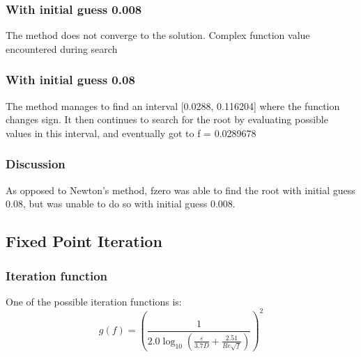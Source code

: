 \documentclass{article}
\begin{document}
    \subsubsection{With initial guess 0.008}
    The method does not converge to the solution. Complex function value encountered during search
    \subsubsection{With initial guess 0.08}
    The method manages to find an interval [0.0288, 0.116204] where the function changes sign. It then continues to search for the root by evaluating possible values in this interval, and eventually got to f = 0.0289678 
    \subsubsection{Discussion}
    As opposed to Newton's method, fzero was able to find the root with initial guess 0.08, but was unable to do so with initial guess 0.008.
    \subsection{Fixed Point Iteration}
    \subsubsection{Iteration function}
    One of the possible iteration functions is: \\
    \[ g(f) = \left(\frac{1}{2.0 \log_{10} \left(\frac{\varepsilon}{3.7D} + \frac{2.51}{\textit{Re}\sqrt{f}}\right)}\right)^2 \]
\end{document}
